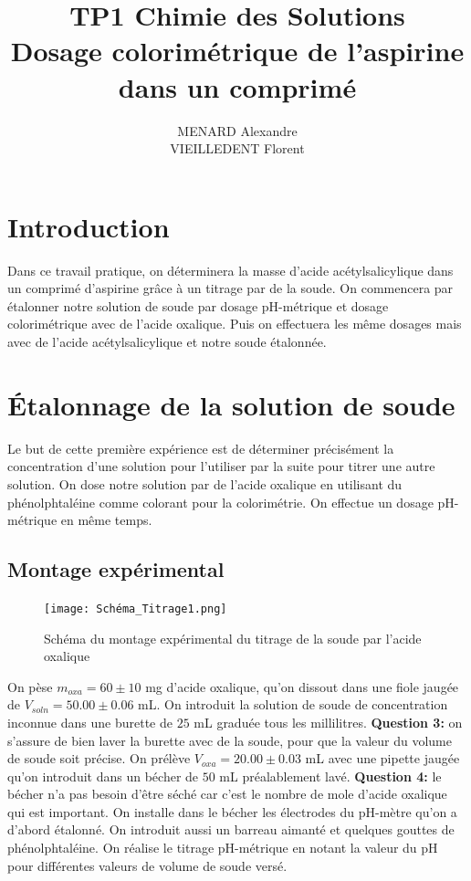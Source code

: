 \documentclass[12pt]{article}
\title{\textbf{TP1 Chimie des Solutions} \\ Dosage colorimétrique de l’aspirine dans un comprimé}
\author{MENARD Alexandre \\ VIEILLEDENT Florent}
\begin{document}
\maketitle

\section*{Introduction}

Dans ce travail pratique, on déterminera la masse d'acide acétylsalicylique dans un comprimé d'aspirine grâce à un titrage par de la soude. 
On commencera par étalonner notre solution de soude par dosage pH-métrique et dosage colorimétrique avec de l'acide oxalique. Puis on effectuera les même dosages mais avec de l'acide acétylsalicylique et notre soude étalonnée. 
\newpage

\section{Étalonnage de la solution de soude}

Le but de cette première expérience est de déterminer précisément la concentration d'une solution pour l'utiliser par la suite pour titrer une autre solution. On dose notre solution par de l'acide oxalique en utilisant du phénolphtaléine comme colorant pour la colorimétrie. On effectue un dosage pH-métrique en même temps. 

	\subsection{Montage expérimental}
	
\begin{figure}[!h]
	\begin{center}
\texttt{[image: Schéma\_Titrage1.png]}
\label{Schéma_Titrage1}
\caption{Schéma du montage expérimental du titrage de la soude par l'acide oxalique}
\end{center}
\end{figure}

On pèse $m_{oxa}=60\pm 10$ mg d'acide oxalique, qu'on dissout dans une fiole jaugée de $V_{soln}=50.00\pm 0.06$ mL. On introduit la solution de soude de concentration inconnue dans une burette de $25$ mL graduée tous les millilitres. \textbf{Question 3:} on s'assure de bien laver la burette avec de la soude, pour que la valeur du volume de soude soit précise. On prélève $V_{oxa}=20.00\pm 0.03$ mL avec une pipette jaugée qu'on introduit dans un bécher de $50$ mL préalablement lavé. \textbf{Question 4:} le bécher n'a pas besoin d'être séché car c'est le nombre de mole d'acide oxalique qui est important. On installe dans le bécher les électrodes du pH-mètre qu'on a d'abord étalonné. On introduit aussi un barreau aimanté et quelques gouttes de phénolphtaléine. On réalise le titrage pH-métrique en notant la valeur du pH pour différentes valeurs de volume de soude versé. 
	
\end{document}
